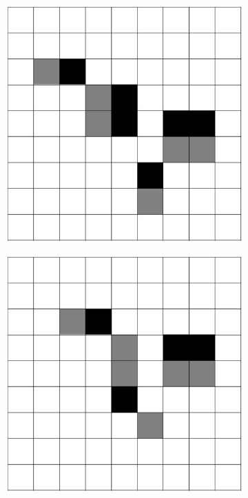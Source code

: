 \documentclass[12pt]{article}
\numberwithin{figure}{section} %
\begin{document}
\begin{figure}[H]
	\begin{subfigure}{0.23\textwidth}
     	\centering
     	\includegraphics[width=\linewidth]{Section4/32.0}
     	\subcaption{}
   	\end{subfigure}
    	\begin{subfigure}{0.23\textwidth}
     	\centering
     	\includegraphics[width=\linewidth]{Section4/32.1}

\end{subfigure}
\end{figure}
\end{document}
